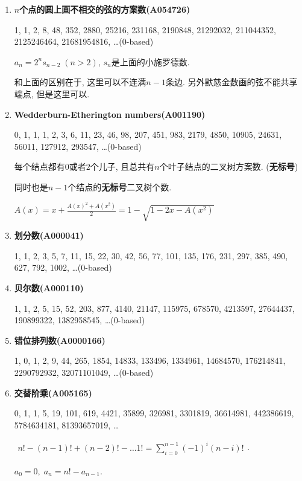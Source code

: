 \begin{enumerate}
\item \textbf{$n$个点的圆上画不相交的弦的方案数(A054726)}

1, 1, 2, 8, 48, 352, 2880, 25216, 231168, 2190848, 21292032, 211044352, 2125246464, 21681954816, \dots \;(0-based)

$ a_n = 2^n s_{n - 2} \; (n > 2) $, $s_n$是上面的小施罗德数.

和上面的区别在于, 这里可以不连满$n-1$条边. 另外默慈金数画的弦不能共享端点, 但是这里可以.

\item \textbf{Wedderburn-Etherington numbers(A001190)}

0, 1, 1, 1, 2, 3, 6, 11, 23, 46, 98, 207, 451, 983, 2179, 4850, 10905, 24631, 56011, 127912, 293547, \dots \;(0-based)

每个结点都有$0$或者$2$个儿子, 且总共有$n$个叶子结点的二叉树方案数. (\textbf{无标号})

同时也是$n-1$个结点的\textbf{无标号}二叉树个数.

$ A(x) = x + \frac {A(x) ^ 2 + A(x ^ 2)} 2 = 1 - \sqrt{1 - 2x - A(x ^ 2)} $
	
\item \textbf{划分数(A000041)}

1, 1, 2, 3, 5, 7, 11, 15, 22, 30, 42, 56, 77, 101, 135, 176, 231, 297, 385, 490, 627, 792, 1002, \dots \;(0-based)

\item \textbf{贝尔数(A000110)}

1, 1, 2, 5, 15, 52, 203, 877, 4140, 21147, 115975, 678570, 4213597, 27644437, 190899322, 1382958545, \dots \;(0-based)

\item \textbf{错位排列数(A0000166)}

1, 0, 1, 2, 9, 44, 265, 1854, 14833, 133496, 1334961, 14684570, 176214841, 2290792932, 32071101049, \dots \;(0-based)

\item \textbf{交替阶乘(A005165)}

0, 1, 1, 5, 19, 101, 619, 4421, 35899, 326981, 3301819, 36614981, 442386619, 5784634181, 81393657019, \dots

$ \begin{aligned} n! - (n - 1)! + (n - 2)! - \dots 1! = \sum_{i = 0} ^ {n - 1} (-1)^i (n - i)! \end{aligned} $.

$ a_0 = 0,\; a_n = n! - a_{n - 1} $.

\end{enumerate}

